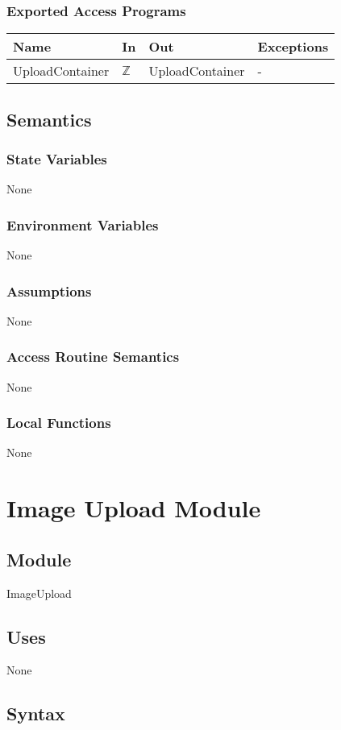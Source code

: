 \documentclass[12pt, titlepage]{article}
\begin{document}
\subsubsection{Exported Access Programs}
\begin{center}
	\begin{tabular}{p{3cm} p{5cm} p{5cm} p{2cm}}
		\hline
		\textbf{Name} & \textbf{In} & \textbf{Out} & \textbf{Exceptions} \\
		\hline
		UploadContainer & $\mathbb{Z}$ & UploadContainer & - \\
		\hline
	\end{tabular}
\end{center}
\subsection{Semantics}
\subsubsection{State Variables}
None
\subsubsection{Environment Variables}
None
\subsubsection{Assumptions}
None
\subsubsection{Access Routine Semantics}
None
\subsubsection{Local Functions}
None

\newpage

\section{Image Upload Module} \label{ImageUpload} 
\subsection{Module}
ImageUpload
\subsection{Uses}
None
\subsection{Syntax}
\end{document}
